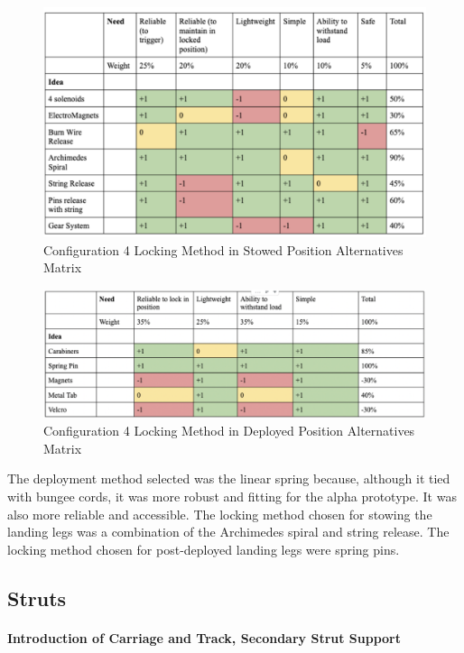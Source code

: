 \begin{figure}[H]
\centering
\includegraphics[scale=0.8]{src/figs/concept4lmam.png}
\caption{Configuration 4 Locking Method in Stowed Position Alternatives Matrix}
\label{figs:c4lmam}
\end{figure}

\begin{figure}[H]
\centering
\includegraphics[scale=0.8]{src/figs/concept4lmstowed.png}
\caption{Configuration 4 Locking Method in Deployed Position Alternatives Matrix}
\label{figs:c4lmstowed}
\end{figure}

\noindent The deployment method selected was the linear spring because, although it tied with bungee cords, it was more robust and fitting for the alpha prototype. It was also more reliable and accessible. The locking method chosen for stowing the landing legs was a combination of the Archimedes spiral and string release. The locking method chosen for post-deployed landing legs were spring pins. 


\subsection{Struts}
\paragraph{Introduction of Carriage and Track, Secondary Strut Support}

